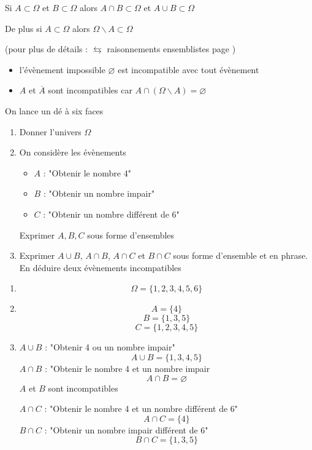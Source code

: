 \begin{preuve}
Si $A \subset \Omega$ et $B \subset \Omega$ alors $A\cap B\subset \Omega$ et $A\cup B\subset \Omega$\newline

De plus si $A \subset \Omega$ alors $\Omega \backslash A \subset \Omega$\newline

(pour plus de détails : $\leftrightarrows$ raisonnements ensemblistes page \pageref{chap:ensembles})
\end{preuve}
\newline
\begin{remarques}
\begin{itemize}
\item l'évènement impossible $\varnothing$ est incompatible avec tout évènement
\item $A$ et $\overline{A}$ sont incompatibles car $A\cap(\Omega \backslash A) = \varnothing$
\end{itemize}
\end{remarques}
\begin{exemple}
On lance un dé à six faces 
\begin{enumerate}
\item Donner l'univers $\Omega$
\item On considère les évènements \begin{itemize}\item $A$ : "Obtenir le nombre 4" \item $B$ : "Obtenir un nombre impair" \item $C$ : "Obtenir un nombre différent de 6" \end{itemize} Exprimer $A,B,C$ sous forme d'ensembles
\item Exprimer $A\cup B$, $A \cap B$, $A \cap C$ et $B \cap C$ sous forme d'ensemble et en phrase. En déduire deux évènements incompatibles
\end{enumerate}
\begin{enumerate}
\item $$\Omega = \{1,2,3,4,5,6\}$$
\item $$A = \{4\}$$
$$B = \{1,3,5\}$$
$$C =\{1,2,3,4,5\}$$
\item $A\cup B$ : "Obtenir 4 ou un nombre impair"
$$A \cup B = \{1,3,4,5\}$$
$A \cap B$ : "Obtenir le nombre 4 et un nombre impair
$$A \cap B = \varnothing$$
$A$ et $B$ sont incompatibles\newline

$A \cap C$ : "Obtenir le nombre 4 et un nombre différent de 6"
$$A \cap C = \{4\}$$
$B\cap C$ : "Obtenir un nombre impair différent de 6"
$$B \cap C = \{1,3,5\}$$
\end{enumerate}
\end{exemple}
